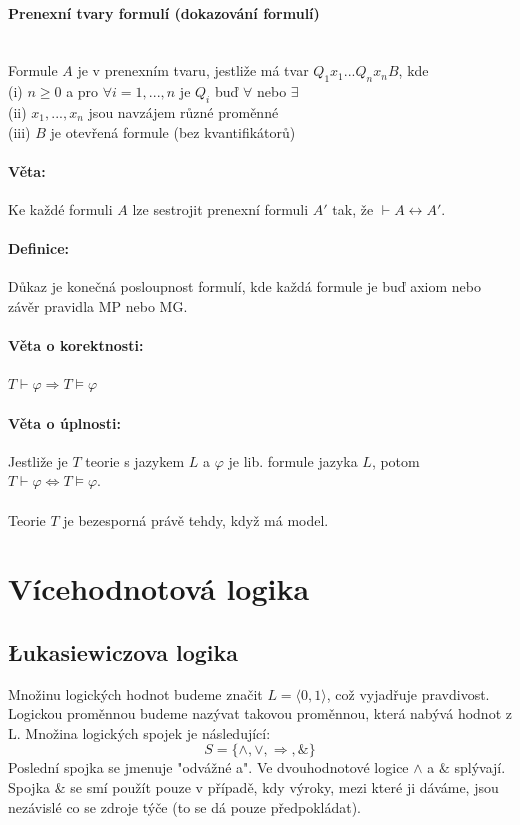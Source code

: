 \documentclass[a4]{report}
\theoremstyle{definition}
\begin{document}
\paragraph*{Prenexní tvary formulí (dokazování formulí)} ~\\
Formule $A$ je v prenexním tvaru, jestliže má tvar $Q_1 x_1 ... Q_n x_n B$, kde\\
(i) $n \geq 0 $ a pro $\forall i=1,...,n $ je $Q_i $ buď $\forall $ nebo $\exists $\\
(ii) $x_1,...,x_n$ jsou navzájem různé proměnné\\
(iii) $B$ je otevřená formule (bez kvantifikátorů)

\paragraph*{Věta:}Ke každé formuli $A$ lze sestrojit prenexní formuli $A'$ tak, že $\vdash A \leftrightarrow A'$.%

\paragraph*{Definice:} Důkaz je konečná posloupnost formulí, kde každá formule je buď axiom nebo závěr pravidla MP nebo MG.

\paragraph*{Věta o korektnosti:}
$T \vdash \varphi \Rightarrow T \models \varphi $

\paragraph*{Věta o úplnosti:}
Jestliže je $T$ teorie s jazykem $L$ a $\varphi $ je lib. formule jazyka $L$, potom $T \vdash \varphi \Leftrightarrow T \models \varphi $.\\
~\\
Teorie $T$ je bezesporná právě tehdy, když má model.



\section{Vícehodnotová logika}

\subsection{Łukasiewiczova logika}
Množinu logických hodnot budeme značit $L=\langle 0,1 \rangle$, což vyjadřuje pravdivost. Logickou proměnnou budeme nazývat takovou proměnnou, která nabývá hodnot z L. Množina logických spojek je následující:
$$S=\{\wedge, \vee,  \Rightarrow, \& \}$$
 Poslední spojka se jmenuje "odvážné a". Ve dvouhodnotové logice $\wedge$ a $\&$ splývají. Spojka \& se smí použít pouze v případě, kdy výroky, mezi které ji dáváme, jsou nezávislé co se zdroje týče (to se dá pouze předpokládat). 
\end{document}
